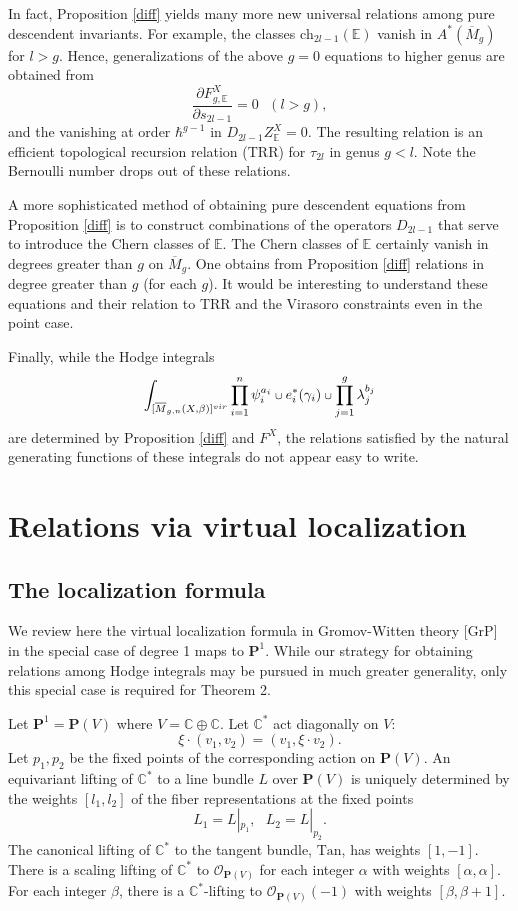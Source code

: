 \documentclass[11 pt]{amsart}
\newcommand{\proj}{\mathbf P}
\newcommand{\oh}{{\mathcal{O}}}
\newcommand{\com}{\mathbb{C}}
\newcommand{\mgn}{\overline{M}_{g,n}}
\def\scup{\mathbin{\text{\scriptsize$\cup$}}}
\newcommand{\hodge}{\mathbb{E}}
\newcommand{\ch}{\text{ch}}
\begin{document}
In fact, Proposition \ref{diff} yields many more new universal relations
among pure descendent invariants.
For example, the classes $\ch_{2l-1}(\hodge)$ vanish
in $A^*(\overline{M}_g)$ for $l>g$.
Hence, generalizations
of the above $g=0$ equations to higher genus
are obtained from 
$$\frac{\partial F_{g,\hodge}^X}{\partial s_{2l-1}}=0 \ \ \ (l>g),$$
and the vanishing at order $\hbar^{g-1}$ in
$D_{2l-1} Z^X_\hodge =0$. 
The resulting relation is an efficient topological
recursion relation (TRR) for $\tau_{2l}$ in genus $g<l$.
Note the Bernoulli number drops out of these relations.

A more sophisticated method of obtaining pure
descendent equations from Proposition \ref{diff} is to
construct combinations of the operators $D_{2l-1}$
that serve to introduce the Chern classes of
$\hodge$. The Chern classes of $\hodge$ certainly vanish in
degrees greater than $g$ on $\overline{M}_g$.
One obtains from Proposition \ref{diff} relations in
degree greater than $g$ (for each $g$). It
would be interesting to understand these
equations and their relation to TRR and 
the Virasoro constraints even in the point case.

Finally, while the Hodge integrals
\begin{equation*}
\int_{[\mgn(X,\beta)]^{vir}} 
\prod_{i=1}^n \psi_i^{a_i} \scup e_i^*(\gamma_i)
\scup \prod_{j=1}^g \lambda_j^{b_j}
\end{equation*} 
are determined by Proposition \ref{diff} and $F^X$, the
relations satisfied by the natural generating functions
of these integrals do not appear easy to write.




\section{\bf{Relations via virtual localization}} 
\subsection{The localization formula}
We review here the virtual localization formula
in Gromov-Witten theory [GrP] in the special case of
degree 1 maps to $\proj^1$. While our strategy for 
obtaining relations among Hodge integrals may be pursued
in much greater generality, only this special case is
required for Theorem 2.

Let $\proj^1=\proj(V)$ where $V=\com \oplus \com$.
Let $\com^*$ act diagonally on $V$:
\begin{equation}
\label{repp}
\xi\cdot (v_1,v_2) = ( v_1, 
\xi \cdot v_2).
\end{equation}
Let $p_1, p_2$ be the fixed points of the corresponding
action on $\proj(V)$.
An equivariant lifting  of $\com^*$ to a line bundle $L$
over 
$\proj(V)$ is uniquely determined by the weights $[l_1,l_2]$
of the fiber
representations at the fixed points 
$$L_1= L|_{p_1}, \ \ \ L_2= L|_{p_2}.$$
The canonical lifting of $\com^*$ to the
tangent bundle, $\text{Tan}$, has weights $[1,-1]$.
There is a scaling lifting of $\com^*$ to $\oh_{\proj(V)}$ for
each integer $\alpha$ with weights $[\alpha, \alpha]$.
For each integer $\beta$, there is a $\com^*$-lifting
to $\oh_{\proj(V)}(-1)$ with weights $[\beta, \beta+1]$.
\end{document}
